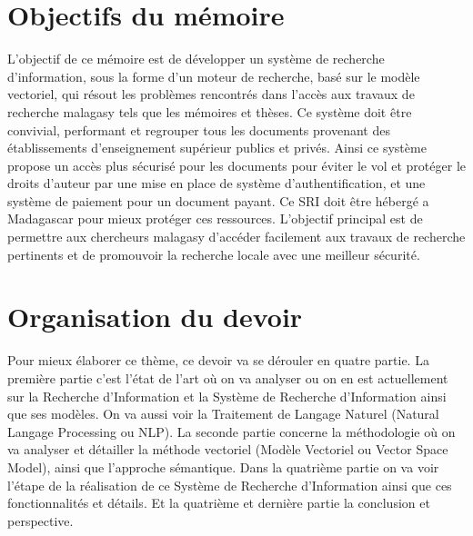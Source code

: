 \section*{Objectifs du mémoire}
L'objectif de ce mémoire est de développer un système de recherche d'information, sous la forme d'un moteur de recherche, basé sur le modèle vectoriel, qui résout les problèmes rencontrés dans l'accès aux travaux de recherche malagasy tels que les mémoires et thèses. Ce système doit être convivial, performant et regrouper tous les documents provenant des établissements d'enseignement supérieur publics et privés. Ainsi ce système propose un accès plus sécurisé pour les documents pour éviter le vol et protéger le droits d'auteur par une mise en place de système d'authentification, et une système de paiement pour un document payant. Ce SRI doit être hébergé a Madagascar pour mieux protéger ces ressources. L'objectif principal est de permettre aux chercheurs malagasy d'accéder facilement aux travaux de recherche pertinents et de promouvoir la recherche locale avec une meilleur sécurité.

\section*{Organisation du devoir}
Pour mieux élaborer ce thème, ce devoir va se dérouler en quatre partie. La première partie c'est l'état de l'art où on va analyser ou on en est actuellement sur la Recherche d'Information et la Système de Recherche d'Information ainsi que ses modèles. On va aussi voir la Traitement de Langage Naturel (Natural Langage Processing ou NLP). La seconde partie concerne la méthodologie où on va analyser et détailler la méthode vectoriel (Modèle Vectoriel ou Vector Space Model), ainsi que l'approche sémantique. Dans la quatrième partie on va voir l'étape de la réalisation de ce Système de Recherche d'Information ainsi que ces fonctionnalités et détails. Et la quatrième et dernière partie la conclusion et perspective. 